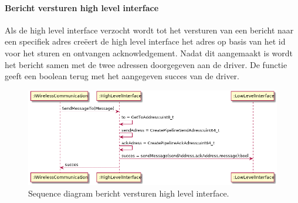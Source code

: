 \documentclass[a4paper, 11pt, oneside]{report}
\begin{document}
\paragraph{Bericht versturen high level interface }
\label{DetailedDesign:NRF24:sequence:highlevelSendMessage}
Als de high level interface verzocht wordt tot het versturen van een bericht naar een specifiek adres creëert de high level interface het adres op basis van het id voor het sturen en ontvangen acknowledgement. Nadat dit aangemaakt is wordt het bericht samen met de twee adressen doorgegeven aan de driver.
De functie geeft een boolean terug met het aangegeven succes van de driver.
\begin{figure}[H]
	\begin{center}\includegraphics[width=1\linewidth]{UML/out/NRF24/sequence/highlevelSendMessage/highlevelSendMessage.png}\end{center}
	\caption{Sequence diagram bericht versturen high level interface.}
	\label{fig:NRF24:sequence:highlevelSendMessage}
\end{figure}
\end{document}
